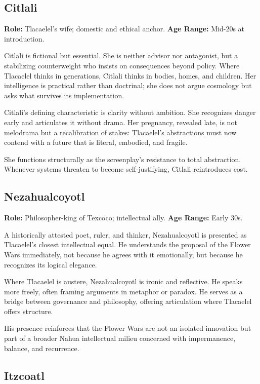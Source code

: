 \documentclass[12pt]{article}
\begin{document}
\subsection*{Citlali}

\textbf{Role:} Tlacaelel's wife; domestic and ethical anchor.  
\textbf{Age Range:} Mid-20s at introduction.

Citlali is fictional but essential. She is neither advisor nor antagonist, but a stabilizing counterweight who insists on consequences beyond policy. Where Tlacaelel thinks in generations, Citlali thinks in bodies, homes, and children. Her intelligence is practical rather than doctrinal; she does not argue cosmology but asks what survives its implementation.

Citlali's defining characteristic is clarity without ambition. She recognizes danger early and articulates it without drama. Her pregnancy, revealed late, is not melodrama but a recalibration of stakes: Tlacaelel's abstractions must now contend with a future that is literal, embodied, and fragile.

She functions structurally as the screenplay's resistance to total abstraction. Whenever systems threaten to become self-justifying, Citlali reintroduces cost.

\subsection*{Nezahualcoyotl}

\textbf{Role:} Philosopher-king of Texcoco; intellectual ally.  
\textbf{Age Range:} Early 30s.

A historically attested poet, ruler, and thinker, Nezahualcoyotl is presented as Tlacaelel's closest intellectual equal. He understands the proposal of the Flower Wars immediately, not because he agrees with it emotionally, but because he recognizes its logical elegance.

Where Tlacaelel is austere, Nezahualcoyotl is ironic and reflective. He speaks more freely, often framing arguments in metaphor or paradox. He serves as a bridge between governance and philosophy, offering articulation where Tlacaelel offers structure.

His presence reinforces that the Flower Wars are not an isolated innovation but part of a broader Nahua intellectual milieu concerned with impermanence, balance, and recurrence.

\subsection*{Itzcoatl}
\end{document}
